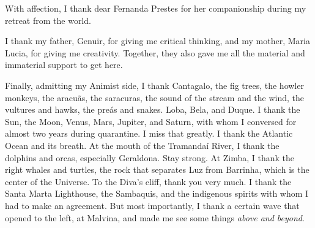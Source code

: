 \documentclass[./main_en.tex]{subfiles}
\begin{document}
\par With affection, I thank dear Fernanda Prestes for her companionship during my retreat from the world.

\par I thank my father, Genuir, for giving me critical thinking, and my mother, Maria Lucia, for giving me creativity. Together, they also gave me all the material and immaterial support to get here.

\par Finally, admitting my Animist side, I thank Cantagalo, the fig trees, the howler monkeys, the aracuãs, the saracuras, the sound of the stream and the wind, the vultures and hawks, the preás and snakes. Loba, Bela, and Duque. I thank the Sun, the Moon, Venus, Mars, Jupiter, and Saturn, with whom I conversed for almost two years during quarantine. I miss that greatly. I thank the Atlantic Ocean and its breath. At the mouth of the Tramandaí River, I thank the dolphins and orcas, especially Geraldona. Stay strong. At Zimba, I thank the right whales and turtles, the rock that separates Luz from Barrinha, which is the center of the Universe. To the Diva's cliff, thank you very much. I thank the Santa Marta Lighthouse, the Sambaquis, and the indigenous spirits with whom I had to make an agreement. But most importantly, I thank a certain wave that opened to the left, at Malvina, and made me see some things \textit{above and beyond}.



\clearpage
\end{document}
